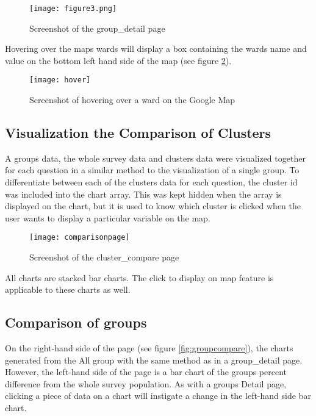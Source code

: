\begin{figure}[h]
\centering
\texttt{[image: figure3.png]}
\caption{Screenshot of the group\_detail page}
\label{fig:figure1}
\end{figure}

Hovering over the map\textquotesingle s wards will display a box containing the ward\textquotesingle s name and value on the bottom left hand side of the map (see figure \ref{fig:hover}).

\begin{figure}[h]
\centering
\texttt{[image: hover]}
\caption{Screenshot of hovering over a ward on the Google Map}
\label{fig:hover}
\end{figure}

\subsection{Visualization the Comparison of Clusters}
A group\textquotesingle s data, the whole survey data and clusters\textsc{} data were visualized together for each question in a similar method to the visualization of a single group. To differentiate between each of the clusters\textsc{} data for each question, the cluster id was included into the chart array. This was kept hidden when the array is displayed on the chart, but it is used to know which cluster is clicked when the user wants to display a particular variable on the map.   

\begin{figure}[h]
\centering
\texttt{[image: comparisonpage]}
\caption{Screenshot of the cluster\_compare page}
\label{fig:comparisonpage}
\end{figure}

All charts are stacked bar charts. The click to display on map feature is applicable to these charts as well.

\subsection{Comparison of groups}
On the right-hand side of the page (see figure \ref{fig:groupcompare}), the charts generated from the All group with the same method as in a group\_detail page. However, the left-hand side of the page is a bar chart of the group\textquotesingle s percent difference from the whole survey population. As with a group\textquotesingle s Detail page, clicking a piece of data on a chart will instigate a change in the left-hand side bar chart.\par

